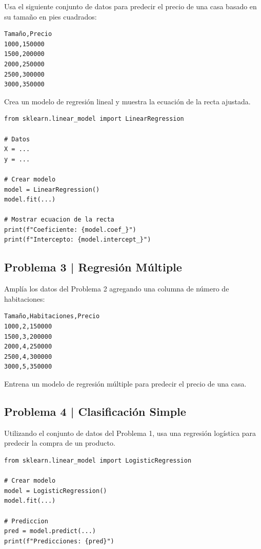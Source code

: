 \documentclass{article}
\begin{document}
Usa el siguiente conjunto de datos para predecir el precio de una casa basado en su tamaño en pies cuadrados:

\begin{verbatim}
Tamaño,Precio
1000,150000
1500,200000
2000,250000
2500,300000
3000,350000
\end{verbatim}

Crea un modelo de regresión lineal y muestra la ecuación de la recta ajustada.

\begin{lstlisting}[style=python]
from sklearn.linear_model import LinearRegression

# Datos
X = ...
y = ...

# Crear modelo
model = LinearRegression()
model.fit(...)

# Mostrar ecuacion de la recta
print(f"Coeficiente: {model.coef_}")
print(f"Intercepto: {model.intercept_}")
\end{lstlisting}

\clearpage

\subsection*{Problema 3 | Regresión Múltiple}

Amplía los datos del Problema 2 agregando una columna de número de habitaciones:

\begin{verbatim}
Tamaño,Habitaciones,Precio
1000,2,150000
1500,3,200000
2000,4,250000
2500,4,300000
3000,5,350000
\end{verbatim}

Entrena un modelo de regresión múltiple para predecir el precio de una casa.

\clearpage

\subsection*{Problema 4 | Clasificación Simple}

Utilizando el conjunto de datos del Problema 1, usa una regresión logística para predecir la compra de un producto.

\begin{lstlisting}[style=python]
from sklearn.linear_model import LogisticRegression

# Crear modelo
model = LogisticRegression()
model.fit(...)

# Prediccion
pred = model.predict(...)
print(f"Predicciones: {pred}")
\end{lstlisting}
\end{document}
